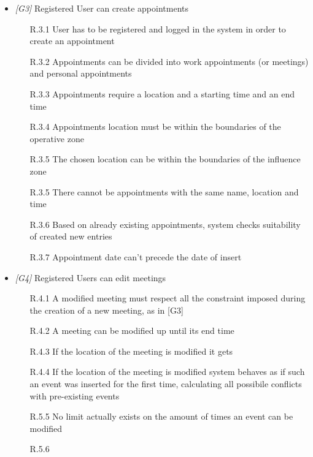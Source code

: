 \begin{itemize}
\item \textit{[G3]} Registered User can create appointments 

 \begin{itemize}
                        \item [R.3.1] User has to be registered and logged in the system in order to create an
appointment
                        \item [R.3.2] Appointments can be divided into work appointments (or meetings) and personal appointments
                        \item [R.3.3] Appointments require a location and a starting time and an end time
                        \item [R.3.4] Appointments location must be within the boundaries of the operative zone
                        \item [R.3.5] The chosen location can be within the boundaries of the influence zone
                        \item [R.3.5] There cannot be appointments with the same name, location and time
                        \item [R.3.6] Based on already existing appointments, system checks suitability of created new entries
                        \item [R.3.7] Appointment date can't precede the date of insert
                        
                  \end{itemize}
                  
\item \textit{[G4]} Registered Users can edit meetings

                  \begin{itemize}
                       \item  [R.4.1] A modified meeting must respect all the constraint imposed during the creation of a new meeting, as in [G3]
                       \item [R.4.2] A meeting can be modified up until its end time
                       \item [R.4.3] If the location of the meeting is modified it gets 
                       \item [R.4.4] If the location of the meeting is modified system behaves as if such an event was inserted for the first time, calculating all possibile conflicts with pre-existing events
                       \item [R.5.5] No limit actually exists on the amount of times an event can be modified
                       \item [R.5.6] 
                     



\end{itemize}
\end{itemize}
